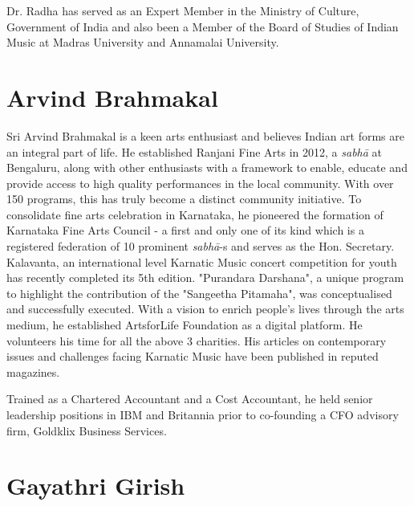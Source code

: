 Dr. Radha has served as an Expert Member in the Ministry of Culture, Government of India and also been a Member of the Board of Studies of Indian Music at Madras University and Annamalai University.

\vspace{-.3cm}

\section*{Arvind Brahmakal}

Sri Arvind Brahmakal is a keen arts enthusiast and believes Indian art forms are an integral part of life. He established Ranjani Fine Arts in 2012, a \textit{sabhā} at Bengaluru, along with other enthusiasts with a framework to enable, educate and provide access to high quality performances in the local community. With over 150 programs, this has truly become a distinct community initiative. To consolidate fine arts celebration in Karnataka, he pioneered the formation of Karnataka Fine Arts Council - a first and only one of its kind which is a registered federation of 10 prominent \textit{sabhā}-s and serves as the Hon. Secretary. Kalavanta, an international level Karnatic Music concert competition for youth has recently completed its 5th edition. "Purandara Darshana", a unique program to highlight the contribution of the "Sangeetha Pitamaha", was conceptualised and successfully executed. With a vision to enrich people's lives through the arts medium, he established ArtsforLife Foundation as a digital platform. He volunteers his time for all the above 3 charities. His articles on contemporary issues and challenges facing Karnatic Music have been published in reputed magazines.

Trained as a Chartered Accountant and a Cost Accountant, he held senior leadership positions in IBM and Britannia prior to co-founding a CFO advisory firm, Goldklix Business Services.


\section*{Gayathri Girish}


